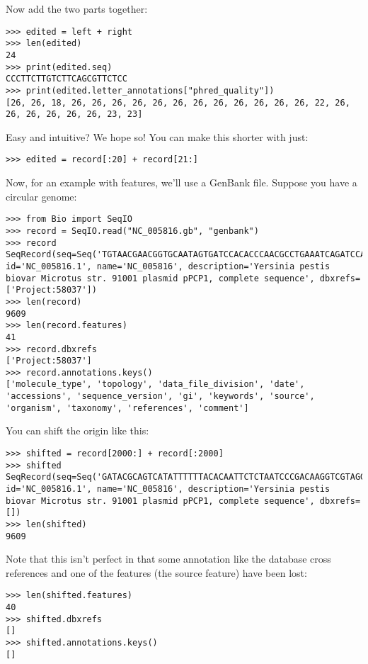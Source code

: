 \noindent Now add the two parts together:

\begin{verbatim}
>>> edited = left + right
>>> len(edited)
24
>>> print(edited.seq)
CCCTTCTTGTCTTCAGCGTTCTCC
>>> print(edited.letter_annotations["phred_quality"])
[26, 26, 18, 26, 26, 26, 26, 26, 26, 26, 26, 26, 26, 26, 26, 22, 26, 26, 26, 26, 26, 26, 23, 23]
\end{verbatim}

\noindent Easy and intuitive? We hope so! You can make this shorter with just:

\begin{verbatim}
>>> edited = record[:20] + record[21:]
\end{verbatim}

Now, for an example with features, we'll use a GenBank file.
Suppose you have a circular genome:

\begin{verbatim}
>>> from Bio import SeqIO
>>> record = SeqIO.read("NC_005816.gb", "genbank")
>>> record
SeqRecord(seq=Seq('TGTAACGAACGGTGCAATAGTGATCCACACCCAACGCCTGAAATCAGATCCAGG...CTG'), id='NC_005816.1', name='NC_005816', description='Yersinia pestis biovar Microtus str. 91001 plasmid pPCP1, complete sequence', dbxrefs=['Project:58037'])
>>> len(record)
9609
>>> len(record.features)
41
>>> record.dbxrefs
['Project:58037']
>>> record.annotations.keys()
['molecule_type', 'topology', 'data_file_division', 'date', 'accessions', 'sequence_version', 'gi', 'keywords', 'source', 'organism', 'taxonomy', 'references', 'comment']
\end{verbatim}

You can shift the origin like this:

\begin{verbatim}
>>> shifted = record[2000:] + record[:2000]
>>> shifted
SeqRecord(seq=Seq('GATACGCAGTCATATTTTTTACACAATTCTCTAATCCCGACAAGGTCGTAGGTC...GGA'), id='NC_005816.1', name='NC_005816', description='Yersinia pestis biovar Microtus str. 91001 plasmid pPCP1, complete sequence', dbxrefs=[])
>>> len(shifted)
9609
\end{verbatim}

Note that this isn't perfect in that some annotation like the database cross references
and one of the features (the source feature) have been lost:

\begin{verbatim}
>>> len(shifted.features)
40
>>> shifted.dbxrefs
[]
>>> shifted.annotations.keys()
[]
\end{verbatim}

